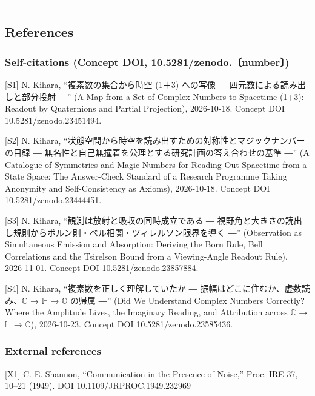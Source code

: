 \documentclass[
  a4paper,
]{article}
\begin{document}
\begin{center}\rule{0.5\linewidth}{0.5pt}\end{center}

\subsection{References}\label{references}

\subsubsection{Self-citations (Concept DOI,
10.5281/zenodo.〔number〕)}\label{self-citations-concept-doi-10.5281zenodo.number}

{[}S1{]} N. Kihara, ``複素数の集合から時空 (1＋3) への写像 ―
四元数による読み出しと部分投射 ―'' (A Map from a Set of Complex Numbers
to Spacetime (1+3): Readout by Quaternions and Partial Projection),
2026-10-18. Concept DOI 10.5281/zenodo.23451494.

{[}S2{]} N. Kihara,
``状態空間から時空を読み出すための対称性とマジックナンバーの目録 ―
無名性と自己無撞着を公理とする研究計画の答え合わせの基準 ―'' (A
Catalogue of Symmetries and Magic Numbers for Reading Out Spacetime from
a State Space: The Answer-Check Standard of a Research Programme Taking
Anonymity and Self-Consistency as Axioms), 2026-10-18. Concept DOI
10.5281/zenodo.23444451.

{[}S3{]} N. Kihara, ``観測は放射と吸収の同時成立である ―
視野角と大きさの読出し規則からボルン則・ベル相関・ツィレルソン限界を導く
―'' (Observation as Simultaneous Emission and Absorption: Deriving the
Born Rule, Bell Correlations and the Tsirelson Bound from a
Viewing-Angle Readout Rule), 2026-11-01. Concept DOI
10.5281/zenodo.23857884.

{[}S4{]} N. Kihara, ``複素数を正しく理解していたか ―
振幅はどこに住むか、虚数読み、\(\mathbb{C}\) → \(\mathbb{H}\) →
\(\mathbb{O}\) の帰属 ―'' (Did We Understand Complex Numbers Correctly?
Where the Amplitude Lives, the Imaginary Reading, and Attribution across
\(\mathbb{C}\) → \(\mathbb{H}\) → \(\mathbb{O}\)), 2026-10-23. Concept
DOI 10.5281/zenodo.23585436.

\subsubsection{External references}\label{external-references}

{[}X1{]} C. E. Shannon, ``Communication in the Presence of Noise,''
Proc. IRE 37, 10--21 (1949). DOI 10.1109/JRPROC.1949.232969
\end{document}
